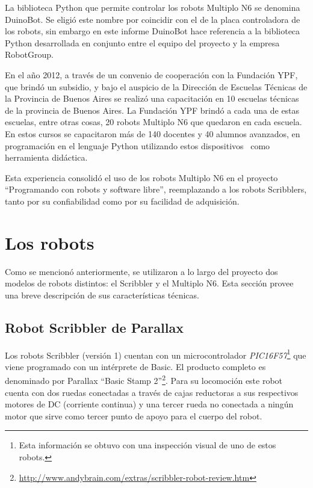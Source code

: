 La biblioteca Python que permite controlar los robots Multiplo N6 se
denomina DuinoBot. Se eligió este nombre por coincidir con el de la placa
controladora de los robots, sin embargo en este informe DuinoBot hace
referencia a la biblioteca Python desarrollada en conjunto
entre el equipo del proyecto \proyecto{} y la empresa RobotGroup.

En el año 2012, a través de un convenio de cooperación con la Fundación YPF,
que brindó
un subsidio, y bajo el auspicio de la Dirección de Escuelas Técnicas de la
Provincia de Buenos Aires se realizó una
capacitación en 10 escuelas técnicas de la
provincia de Buenos Aires. La Fundación YPF brindó a cada una de estas
escuelas, entre otras
cosas, 20 robots Multiplo N6 que quedaron en cada escuela. En estos cursos
se capacitaron más de 140 docentes y 40 alumnos avanzados, en programación
en el lenguaje Python utilizando
estos dispositivos~\citep{diaz_aprendiendo_2012} como herramienta didáctica.

Esta experiencia consolidó el uso de
los robots Multiplo N6 en el proyecto
``Programando con robots y software libre'', reemplazando
a los robots Scribblers, tanto por su confiabilidad como por su facilidad de
adquisición.

\section{Los robots}
Como se mencionó anteriormente, se utilizaron a lo largo del proyecto dos
modelos de robots distintos: el Scribbler y el Multiplo N6. Esta sección provee una
breve descripción de sus características técnicas.

\subsection{Robot Scribbler de Parallax}
Los robots Scribbler (versión 1) cuentan con un microcontrolador
\textit{PIC16F57}\footnote{Esta información se obtuvo con una inspección
visual de uno de estos robots.}
que viene programado con un intérprete de Basic. El producto
completo es denominado por Parallax
``Basic Stamp 2''\footnote{\url{http://www.andybrain.com/extras/scribbler-robot-review.htm}}.
Para su locomoción este robot cuenta con dos ruedas conectadas a través de
cajas
reductoras
a sus respectivos motores de DC (corriente continua)  y una tercer rueda no conectada a ningún
motor que sirve como tercer punto de apoyo para el cuerpo del robot.

